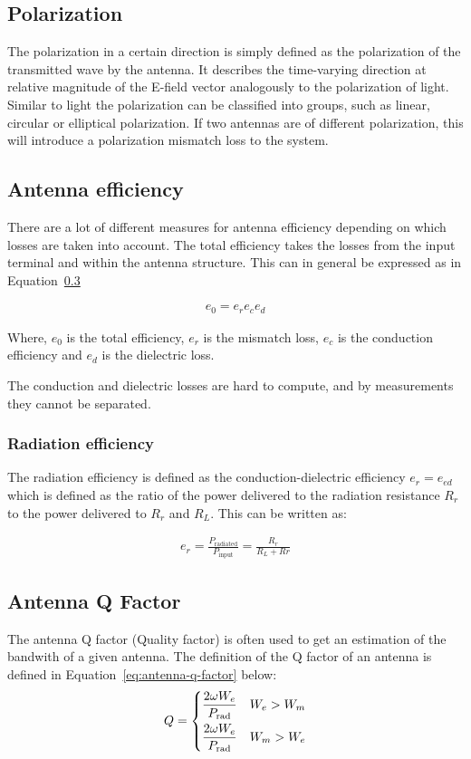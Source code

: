 \subsection{Polarization}
The polarization in a certain direction is simply defined as the polarization of the transmitted wave by the antenna. It describes the time-varying direction at relative magnitude of the E-field vector analogously to the polarization of light. Similar to light the polarization can be classified into groups, such as linear, circular or elliptical polarization. If two antennas are of different polarization, this will introduce a polarization mismatch loss to the system. 

\subsection{Antenna efficiency}
There are a lot of different measures for antenna efficiency depending on which losses are taken into account. The total efficiency takes the losses from the input terminal and within the antenna structure. This can in general be expressed as in Equation~\ref{}

\begin{align}
  e_0 = e_r e_c e_d
\end{align}

Where, $e_0$ is the total efficiency, $e_r$ is the mismatch loss, $e_c$ is the conduction efficiency and $e_d$ is the dielectric loss. 

The conduction and dielectric losses are hard to compute, and by measurements they cannot be separated. 

\subsubsection{Radiation efficiency}
The radiation efficiency is defined as the conduction-dielectric efficiency $e_r = e_{ed}$ which is defined as the ratio of the power delivered to the radiation resistance $R_r$ to the power delivered to $R_r$ and $R_L$. This can be written as:


\begin{align}
  e_r = \frac{P_{\text{radiated}}}{P_{\text{input}}} = \frac{R_r}{R_L+Rr}
\end{align}

\subsection{Antenna Q Factor}
The antenna Q factor (Quality factor) is often used to get an estimation of the bandwith of a given antenna. The definition of the Q factor of an antenna is defined in Equation~\ref{eq:antenna-q-factor} below\cite{fundamentalMcLean}: 
\begin{align}
  \label{eq:antenna-q-factor}
      Q =
    \begin{dcases}
       \frac{2 \omega W_e}{P_{\text{rad}}} & W_e > W_m  \\
       \frac{2 \omega W_e}{P_{\text{rad}}} & W_m > W_e 
    \end{dcases}
\end{align}

